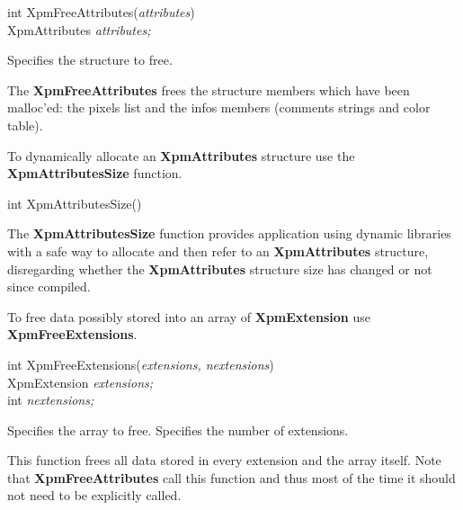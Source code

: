 \begin{flushleft} 

int XpmFreeAttributes({\it attributes})\\

\hspace{1cm}XpmAttributes {\it *attributes;}

\end{flushleft}

\begin{description}

 Specifies the structure to free.

\end{description}

The {\bf XpmFreeAttributes} frees the structure members which have been
malloc'ed: the pixels list and the infos members (comments strings and color
table).

\vspace{.5cm}
To dynamically allocate an {\bf XpmAttributes} structure use the {\bf
Xpm\-Attributes\-Size} function.

\begin{flushleft} 

int XpmAttributesSize()

\end{flushleft}

The {\bf XpmAttributesSize} function provides application using dynamic
libraries with a safe way to allocate and then refer to an {\bf XpmAttributes}
structure, disregarding whether the {\bf XpmAttributes} structure size has
changed or not since compiled.

\vspace{.5cm}
To free data possibly stored into an array of {\bf XpmExtension} use {\bf
XpmFreeExtensions}.

\begin{flushleft} 

int XpmFreeExtensions({\it extensions, nextensions})\\

\hspace{1cm}XpmExtension {\it *extensions;}\\
\hspace{1cm}int {\it nextensions;}

\end{flushleft}

\begin{description}

 Specifies the array to free.
 Specifies the number of extensions.

\end{description}

This function frees all data stored in every extension and the array itself.
Note that {\bf XpmFreeAttributes} call this function and thus most of the time
it should not need to be explicitly called.

 
